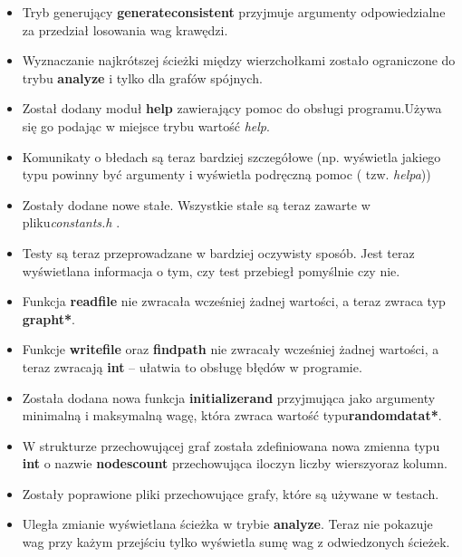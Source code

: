 \documentclass{article}
\begin{document}
\begin{itemize}
    \item Tryb generujący \textbf{generate\textunderscore consistent} przyjmuje argumenty odpowiedzialne za przedział losowania wag krawędzi.
    \item Wyznaczanie najkrótszej ścieżki między wierzchołkami zostało ograniczone do trybu \textbf{analyze} i tylko dla grafów spójnych. 
    \item Został dodany moduł \textbf{help} zawierający pomoc do obsługi programu.\linebreak Używa się go podając w miejsce trybu wartość \emph{help}.
    \item Komunikaty o błedach są teraz bardziej szczegółowe (np. wyświetla jakiego typu powinny być argumenty i wyświetla podręczną pomoc ( tzw. \emph{helpa}))
    \item Zostały dodane nowe stałe. Wszystkie stałe są teraz zawarte w pliku\linebreak \emph{constants.h} .
    \item Testy są teraz przeprowadzane w bardziej oczywisty sposób. Jest teraz wyświetlana informacja o tym, czy test przebiegł pomyślnie czy nie. 
    \item Funkcja \textbf{read\textunderscore file} nie zwracała wcześniej żadnej wartości, a teraz zwraca typ \textbf{graph\textunderscore t*}.
    \item Funkcje \textbf{write\textunderscore file} oraz \textbf{find\textunderscore path} nie zwracały wcześniej żadnej wartości, a teraz zwracają \textbf{int} -- ułatwia to obsługę błędów w programie.
    \item Została dodana nowa funkcja \textbf{initialize\textunderscore rand} przyjmująca jako argumenty minimalną i maksymalną wagę, która zwraca wartość typu\linebreak \textbf{random\textunderscore data\textunderscore t*}.
    \item W strukturze przechowującej graf została zdefiniowana nowa zmienna typu \textbf{int} o nazwie \textbf{nodes\textunderscore count} przechowująca iloczyn liczby wierszy\linebreak oraz kolumn.
    \item Zostały poprawione pliki przechowujące grafy, które są używane w testach.
    \item Uległa zmianie wyświetlana ścieżka w trybie \textbf{analyze}. Teraz nie pokazuje wag przy każym przejściu tylko wyświetla sumę wag z odwiedzonych ścieżek.
\end{itemize}
\end{document}
